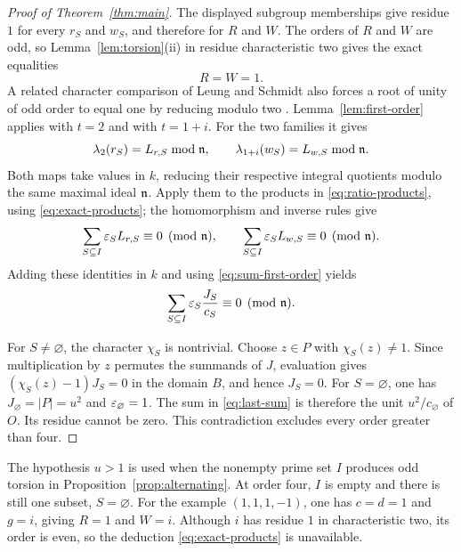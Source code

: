 \begin{proof}[Proof of Theorem~\ref{thm:main}]
The displayed subgroup memberships give residue \(1\) for every
\(r_S\) and \(w_S\), and therefore for \(R\) and \(W\).
The orders of \(R\) and \(W\) are odd, so
Lemma~\ref{lem:torsion}(ii) in residue
characteristic two gives the exact equalities
\begin{equation}\label{eq:exact-products}
 R=W=1.
\end{equation}
A related character comparison of Leung and Schmidt also forces a root
of unity of odd order to equal one by reducing modulo two
\cite[author manuscript, proof of Theorem~3.5, p.~10]{LeungSchmidt2012}.
Lemma~\ref{lem:first-order} applies with \(t=2\) and with \(t=1+i\).
For the two families it gives
\[
 \lambda_2(r_S)=L_{r,S}\bmod\mathfrak n,\qquad
 \lambda_{1+i}(w_S)=L_{w,S}\bmod\mathfrak n.
\]
Both maps take values in \(k\), reducing their respective integral
quotients modulo the same maximal ideal \(\mathfrak n\). Apply them to the
products in \eqref{eq:ratio-products}, using \eqref{eq:exact-products};
the homomorphism and inverse rules give
\[
 \sum_{S\subseteq I}\varepsilon_S L_{r,S}\equiv0\pmod{\mathfrak n},\qquad
 \sum_{S\subseteq I}\varepsilon_S L_{w,S}\equiv0\pmod{\mathfrak n}.
\]
Adding these identities in \(k\) and using \eqref{eq:sum-first-order}
yields
\begin{equation}\label{eq:last-sum}
 \sum_{S\subseteq I}\varepsilon_S\frac{J_S}{c_S}\equiv0\pmod{\mathfrak n}.
\end{equation}

For \(S\ne\varnothing\), the character \(\chi_S\) is nontrivial.
Choose \(z\in P\) with \(\chi_S(z)\ne1\). Since multiplication by
\(z\) permutes the summands of \(J\), evaluation gives
\((\chi_S(z)-1)J_S=0\) in the domain \(B\), and hence \(J_S=0\).
For \(S=\varnothing\), one has \(J_{\varnothing}=|P|=u^2\) and
\(\varepsilon_{\varnothing}=1\). The sum in \eqref{eq:last-sum} is therefore
the unit \(u^2/c_{\varnothing}\) of \(O\). Its residue cannot be zero.
This contradiction excludes every order greater than four.
\end{proof}

\begin{remark}
The hypothesis \(u>1\) is used when the nonempty prime set \(I\)
produces odd torsion in Proposition~\ref{prop:alternating}. At order
four, \(I\) is empty and there is still one subset,
\(S=\varnothing\). For the example \((1,1,1,-1)\), one has
\(c=d=1\) and \(g=i\), giving \(R=1\) and \(W=i\).
Although \(i\) has residue \(1\) in characteristic two, its order is
even, so the deduction \eqref{eq:exact-products} is unavailable.
\end{remark}

